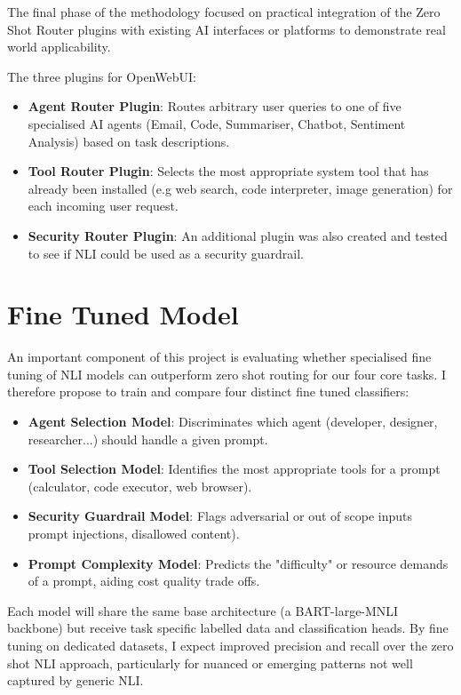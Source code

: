 The final phase of the methodology focused on practical integration of the Zero Shot Router plugins with existing AI interfaces or platforms to demonstrate real world applicability.

The three plugins for OpenWebUI:

\begin{itemize}
    \item \textbf{Agent Router Plugin}: Routes arbitrary user queries to one of five specialised AI agents (Email, Code, Summariser, Chatbot, Sentiment Analysis) based on task descriptions.
    \item \textbf{Tool Router Plugin}: Selects the most appropriate system tool that has already been installed (e.g web search, code interpreter, image generation) for each incoming user request.
    \item \textbf{Security Router Plugin}: An additional plugin was also created and tested to see if NLI could be used as a security guardrail.
\end{itemize}


\section{Fine Tuned Model}
\label{fine tuned model}
An important component of this project is evaluating whether specialised fine tuning of NLI models can outperform zero shot routing for our four core tasks. I therefore propose to train and compare four distinct fine tuned classifiers:

\begin{itemize}
    \item \textbf{Agent Selection Model}: Discriminates which agent (developer, designer, researcher...) should handle a given prompt.
    \item \textbf{Tool Selection Model}: Identifies the most appropriate tools for a prompt (calculator, code executor, web browser).
    \item \textbf{Security Guardrail Model}: Flags adversarial or out of scope inputs prompt injections, disallowed content).
    \item \textbf{Prompt Complexity Model}: Predicts the "difficulty" or resource demands of a prompt, aiding cost quality trade offs.
\end{itemize}

Each model will share the same base architecture (a BART-large-MNLI backbone) but receive task specific labelled data and classification heads. By fine tuning on dedicated datasets, I expect improved precision and recall over the zero shot NLI approach, particularly for nuanced or emerging patterns not well captured by generic NLI.

